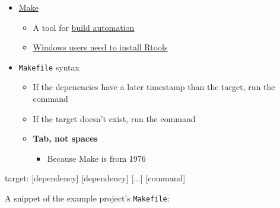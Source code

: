 \documentclass[
]{article}
\newenvironment{Shaded}{\begin{snugshade}}{\end{snugshade}}
\newcommand{\CharTok}[1]{\textcolor[rgb]{0.31,0.60,0.02}{#1}}
\newcommand{\CommentTok}[1]{\textcolor[rgb]{0.56,0.35,0.01}{\textit{#1}}}
\newcommand{\DataTypeTok}[1]{\textcolor[rgb]{0.13,0.29,0.53}{#1}}
\newcommand{\DecValTok}[1]{\textcolor[rgb]{0.00,0.00,0.81}{#1}}
\newcommand{\NormalTok}[1]{#1}
\providecommand{\tightlist}{%
  \setlength{\itemsep}{0pt}\setlength{\parskip}{0pt}}
\begin{document}
\begin{itemize}
\tightlist
\item
  \href{https://www.gnu.org/software/make/}{Make}

  \begin{itemize}
  \tightlist
  \item
    A tool for \href{https://en.wikipedia.org/wiki/Build_automation}{build automation}
  \item
    \href{https://cran.r-project.org/bin/windows/Rtools/}{Windows users need to install Rtools}
  \end{itemize}
\item
  \texttt{Makefile} syntax

  \begin{itemize}
  \tightlist
  \item
    If the depenencies have a later timestamp than the target, run the command
  \item
    If the target doesn't exist, run the command
  \item
    \textbf{Tab, not spaces}

    \begin{itemize}
    \tightlist
    \item
      Because Make is from 1976
    \end{itemize}
  \end{itemize}
\end{itemize}

\begin{Shaded}
\begin{Highlighting}[]
\DecValTok{target:}\DataTypeTok{ [dependency] [dependency] [...]}
\NormalTok{    [command]}
\end{Highlighting}
\end{Shaded}

A snippet of the example project's \texttt{Makefile}:

\begin{Shaded}
\end{Shaded}
\end{document}
